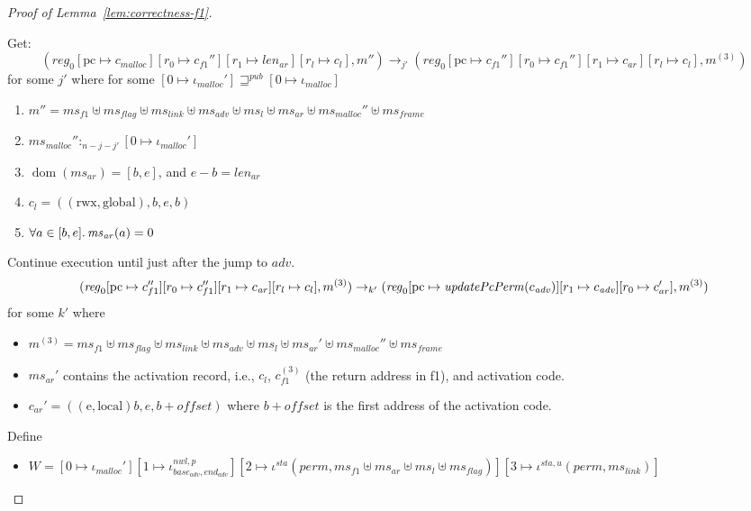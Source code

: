 \documentclass[a4paper]{article}
\newcommand{\update}[2]{[#1 \mapsto #2]}
\DeclareMathOperator{\dom}{dom}
\newcommand{\var}[1]{\mathit{#1}}
\newcommand{\hs}{\var{ms}}
\newcommand{\ms}{\hs}
\newcommand{\pcreg}{\mathrm{pc}}
\newcommand{\start}{\var{base}}
\newcommand{\addrend}{\var{end}}
\newcommand{\reg}{\var{reg}}
\newcommand{\heap}{\var{mem}}
\newcommand{\perm}{\var{perm}}
\newcommand{\adv}{\var{adv}}
\newcommand{\link}{\var{link}}
\newcommand{\flag}{\var{flag}}
\newcommand{\nwl}{\var{nwl}}
\newcommand{\sta}{\var{sta}}
\newcommand{\plainfun}[2]{
  \ifthenelse{\equal{#2}{}}
  {\mathit{#1}}
  {\mathit{#1}(#2)}
}
\newcommand{\updatePcPerm}[1]{\plainfun{updatePcPerm}{#1}}
\newcommand{\futurewk}{\mathbin{\sqsupseteq}^{\var{pub}}}
\newcommand{\heapSat}[3][\heap]{#1 :_{#2} #3}
\newcommand{\codelabel}[1]{\mathit{#1}}
\newcommand{\malloc}{\codelabel{malloc}}
\newcommand{\plainperm}[1]{\mathrm{#1}}
\newcommand{\entry}{\plainperm{e}}
\newcommand{\rwx}{\plainperm{rwx}}
\newcommand{\local}{\plainperm{local}}
\newcommand{\glob}{\plainperm{global}}
\newcommand{\step}[1][]{\rightarrow_{#1}}
\begin{document}
\begin{proof}[Proof of Lemma~\ref{lem:correctness-f1}]
\begin{itemize}
  \end{itemize}
  Get:
  \[
    (\reg_0\update{\pcreg}{c_\malloc}\update{r_0}{c_{f1}''}\update{r_1}{\var{len}_{\var{ar}}}\update{r_l}{c_l},m'')
    \step[j']
    (\reg_0\update{\pcreg}{c_{f1}''}\update{r_0}{c_{f1}''}\update{r_1}{c_{\var{ar}}}\update{r_l}{c_l},m^{(3)})
  \]
  for some $j'$ where for some $[0 \mapsto \iota_{\malloc}'] \futurewk [0 \mapsto \iota_{\malloc}]$
  \begin{enumerate}[resume]
  \item $m'' = \hs_{f1} \uplus 
    \hs_\flag \uplus                
    \ms_{\var{link}} \uplus 
    \hs_\adv \uplus 
    \ms_{l} \uplus
    \ms_{\var{ar}} \uplus
    \ms_{\malloc}'' \uplus 
    \hs_{\var{frame}} $
  \item $\heapSat[\ms_{\malloc}'']{n-j-j'}{[0 \mapsto \iota_{\malloc}']}$ \label{f1:mallocsat}
  \item $\dom(\hs_{\var{ar}}) = [b,e]$, and $e-b = \var{len}_{\var{ar}}$
  \item $c_l = ((\rwx,\glob),b,e,b)$ \label{test}
  \item $\forall a \in [b,e] \ldotp \ms_{\var{ar}}(a) = 0$
  \end{enumerate}
  Continue execution until just after the jump to $\var{adv}$.
  \[
    (\reg_0\update{\pcreg}{c_{f1}''}\update{r_0}{c_{f1}''}\update{r_1}{c_{\var{ar}}}\update{r_l}{c_l},m^{(3)})
    \step[k']
    (\reg_0\update{\pcreg}{\updatePcPerm{c_{\var{adv}}}}\update{r_1}{c_{\var{adv}}}\update{r_0}{c_{ar}'},m^{(3)})
  \]
  for some $k'$ where
  \begin{itemize}
  \item $m^{(3)} = \hs_{f1} \uplus 
    \hs_\flag \uplus                
    \ms_{\var{link}} \uplus 
    \hs_\adv \uplus 
    \ms_{l} \uplus
    \ms_{\var{ar}}' \uplus
    \ms_{\malloc}'' \uplus 
    \hs_{\var{frame}} $
  \item $\ms_{\var{ar}}'$ contains the activation record, i.e., $c_l$, $c_{f1}^{(3)}$ (the return address in f1), and activation code.
  \item $c_{\var{ar}}' = ((\entry,\local)b,e,b+\var{offset})$ where $b+\var{offset}$ is the first address of the activation code.
  \end{itemize}
  Define
  \begin{itemize}
  \item $W = [0 \mapsto \iota_\malloc']
    [1 \mapsto \iota^{\nwl,p}_{\start_\adv,\addrend_\adv}]
    [2 \mapsto \iota^\sta (\perm,\ms_{f1} \uplus \ms_{\var{ar}} \uplus \ms_l \uplus \ms_\flag)]
    [3 \mapsto \iota^{\sta,u}(\perm,\ms_\link)]$

\end{itemize}
\end{proof}
\end{document}
